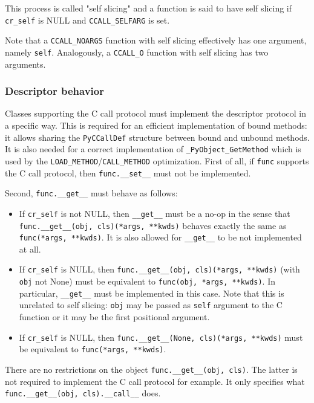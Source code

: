 This process is called "self slicing" and a function is said to have
self slicing if \texttt{cr\_self} is NULL and \texttt{CCALL\_SELFARG} is
set.

Note that a \texttt{CCALL\_NOARGS} function with self slicing
effectively has one argument, namely \texttt{self}. Analogously, a
\texttt{CCALL\_O} function with self slicing has two arguments.

\subsubsection{Descriptor behavior}

Classes supporting the C call protocol must implement the descriptor
protocol in a specific way. This is required for an efficient
implementation of bound methods: it allows sharing the
\texttt{PyCCallDef} structure between bound and unbound methods. It is
also needed for a correct implementation of
\texttt{\_PyObject\_GetMethod} which is used by the
\texttt{LOAD\_METHOD}/\texttt{CALL\_METHOD} optimization. First of all,
if \texttt{func} supports the C call protocol, then
\texttt{func.\_\_set\_\_} must not be implemented.

Second, \texttt{func.\_\_get\_\_} must behave as follows:

\begin{itemize}
\tightlist
\item
  If \texttt{cr\_self} is not NULL, then \texttt{\_\_get\_\_} must be a
  no-op in the sense that
  \texttt{func.\_\_get\_\_(obj,\ cls)(*args,\ **kwds)} behaves exactly
  the same as \texttt{func(*args,\ **kwds)}. It is also allowed for
  \texttt{\_\_get\_\_} to be not implemented at all.
\item
  If \texttt{cr\_self} is NULL, then
  \texttt{func.\_\_get\_\_(obj,\ cls)(*args,\ **kwds)} (with
  \texttt{obj} not None) must be equivalent to
  \texttt{func(obj,\ *args,\ **kwds)}. In particular,
  \texttt{\_\_get\_\_} must be implemented in this case. Note that this
  is unrelated to self slicing: \texttt{obj} may be passed as
  \texttt{self} argument to the C function or it may be the first
  positional argument.
\item
  If \texttt{cr\_self} is NULL, then
  \texttt{func.\_\_get\_\_(None,\ cls)(*args,\ **kwds)} must be
  equivalent to \texttt{func(*args,\ **kwds)}.
\end{itemize}

There are no restrictions on the object
\texttt{func.\_\_get\_\_(obj,\ cls)}. The latter is not required to
implement the C call protocol for example. It only specifies what
\texttt{func.\_\_get\_\_(obj,\ cls).\_\_call\_\_} does.


